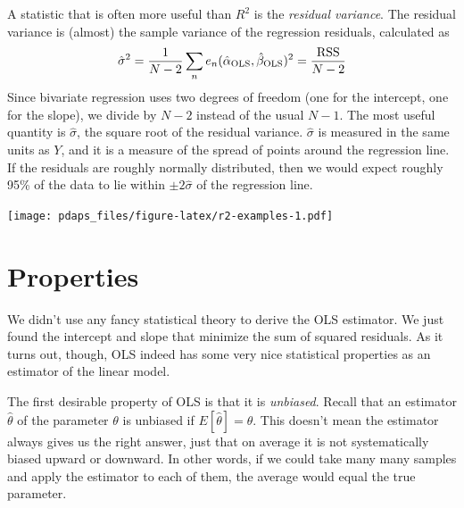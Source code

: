 \documentclass[12pt,oneside,openany]{book}
\begin{document}
A statistic that is often more useful than \(R^2\) is the \emph{residual
variance}. The residual variance is (almost) the sample variance of the
regression residuals, calculated as \[
\hat{\sigma}^2
= \frac{1}{N - 2} \sum_n e_n(\hat{\alpha}_{\text{OLS}}, \hat{\beta}_{\text{OLS}})^2
= \frac{\mathop{\rm RSS}\nolimits}{N - 2}
\] Since bivariate regression uses two degrees of freedom (one for the
intercept, one for the slope), we divide by \(N - 2\) instead of the
usual \(N - 1\). The most useful quantity is \(\hat{\sigma}\), the
square root of the residual variance. \(\hat{\sigma}\) is measured in
the same units as \(Y\), and it is a measure of the spread of points
around the regression line. If the residuals are roughly normally
distributed, then we would expect roughly 95\% of the data to lie within
\(\pm 2 \hat{\sigma}\) of the regression line.

\texttt{[image: pdaps\_files/figure-latex/r2-examples-1.pdf]}

\section{Properties}\label{properties}

We didn't use any fancy statistical theory to derive the OLS estimator.
We just found the intercept and slope that minimize the sum of squared
residuals. As it turns out, though, OLS indeed has some very nice
statistical properties as an estimator of the linear model.

The first desirable property of OLS is that it is \emph{unbiased}.
Recall that an estimator \(\hat{\theta}\) of the parameter \(\theta\) is
unbiased if \(E[\hat{\theta}] = \theta\). This doesn't mean the
estimator always gives us the right answer, just that on average it is
not systematically biased upward or downward. In other words, if we
could take many many samples and apply the estimator to each of them,
the average would equal the true parameter.
\end{document}
